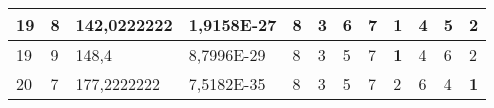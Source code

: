 \documentclass[conference]{IEEEtran}
\begin{document}
\begin{table*}[]
\begin{tabular}{|llll|llllllll|}
\multicolumn{1}{|l|}{19}                                                             & \multicolumn{1}{l|}{8}                                                                 & \multicolumn{1}{l|}{142,0222222}                                                           & 1,9158E-27                              & \multicolumn{1}{l|}{8}                                                           & \multicolumn{1}{l|}{3}                                                           & \multicolumn{1}{l|}{6}                                                           & \multicolumn{1}{l|}{7}                                                           & \multicolumn{1}{l|}{\textbf{1}}                                                  & \multicolumn{1}{l|}{4}                                                           & \multicolumn{1}{l|}{5}                                                           & 2                                   \\ \hline
\multicolumn{1}{|l|}{19}                                                             & \multicolumn{1}{l|}{9}                                                                 & \multicolumn{1}{l|}{148,4}                                                                 & 8,7996E-29                              & \multicolumn{1}{l|}{8}                                                           & \multicolumn{1}{l|}{3}                                                           & \multicolumn{1}{l|}{5}                                                           & \multicolumn{1}{l|}{7}                                                           & \multicolumn{1}{l|}{\textbf{1}}                                                  & \multicolumn{1}{l|}{4}                                                           & \multicolumn{1}{l|}{6}                                                           & 2                                   \\ \hline
\multicolumn{1}{|l|}{20}                                                             & \multicolumn{1}{l|}{7}                                                                 & \multicolumn{1}{l|}{177,2222222}                                                           & 7,5182E-35                              & \multicolumn{1}{l|}{8}                                                           & \multicolumn{1}{l|}{3}                                                           & \multicolumn{1}{l|}{5}                                                           & \multicolumn{1}{l|}{7}                                                           & \multicolumn{1}{l|}{2}                                                           & \multicolumn{1}{l|}{6}                                                           & \multicolumn{1}{l|}{4}                                                           & \textbf{1}                          \\ \hline

\end{tabular}
\end{table*}
\end{document}
